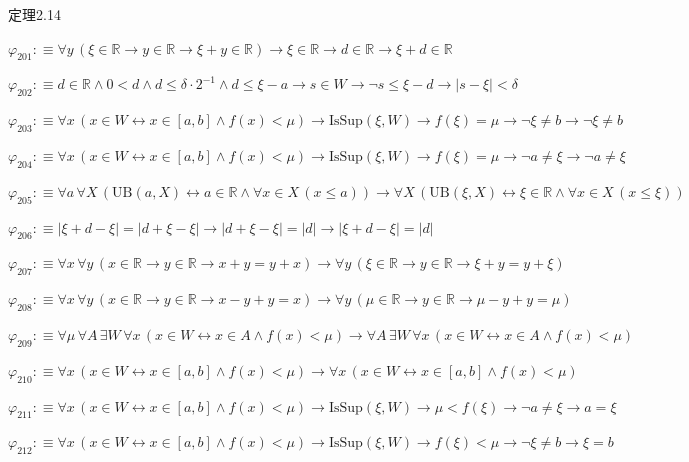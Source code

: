 \begin{fullproof}{定理2.14}
\begin{abbrevlist}
\item $\varphi_{201} :\equiv \forall y\,(\xi \in \mathbb{R} \to y \in \mathbb{R} \to \xi + y \in \mathbb{R}) \to \xi \in \mathbb{R} \to d \in \mathbb{R} \to \xi + d \in \mathbb{R}$
\item $\varphi_{202} :\equiv d \in \mathbb{R} \land 0 < d \land d \leq \delta \cdot 2^{-1} \land d \leq \xi - a \to s \in W \to \neg s \leq \xi - d \to \lvert s - \xi \rvert < \delta$
\item $\varphi_{203} :\equiv \forall x\,(x \in W \leftrightarrow x \in [a,b] \land f(x) < \mu) \to \mathrm{IsSup}(\xi,W) \to f(\xi) = \mu \to \neg \xi \neq b \to \neg \xi \neq b$
\item $\varphi_{204} :\equiv \forall x\,(x \in W \leftrightarrow x \in [a,b] \land f(x) < \mu) \to \mathrm{IsSup}(\xi,W) \to f(\xi) = \mu \to \neg a \neq \xi \to \neg a \neq \xi$
\item $\varphi_{205} :\equiv \forall a\,\forall X\,(\mathrm{UB}(a,X) \leftrightarrow a \in \mathbb{R} \land \forall x \in X\,(x \leq a)) \to \forall X\,(\mathrm{UB}(\xi,X) \leftrightarrow \xi \in \mathbb{R} \land \forall x \in X\,(x \leq \xi))$
\item $\varphi_{206} :\equiv \lvert \xi + d - \xi \rvert = \lvert d + \xi - \xi \rvert \to \lvert d + \xi - \xi \rvert = \lvert d \rvert \to \lvert \xi + d - \xi \rvert = \lvert d \rvert$
\item $\varphi_{207} :\equiv \forall x\,\forall y\,(x \in \mathbb{R} \to y \in \mathbb{R} \to x + y = y + x) \to \forall y\,(\xi \in \mathbb{R} \to y \in \mathbb{R} \to \xi + y = y + \xi)$
\item $\varphi_{208} :\equiv \forall x\,\forall y\,(x \in \mathbb{R} \to y \in \mathbb{R} \to x - y + y = x) \to \forall y\,(\mu \in \mathbb{R} \to y \in \mathbb{R} \to \mu - y + y = \mu)$
\item $\varphi_{209} :\equiv \forall \mu\,\forall A\,\exists W\,\forall x\,(x \in W \leftrightarrow x \in A \land f(x) < \mu) \to \forall A\,\exists W\,\forall x\,(x \in W \leftrightarrow x \in A \land f(x) < \mu)$
\item $\varphi_{210} :\equiv \forall x\,(x \in W \leftrightarrow x \in [a,b] \land f(x) < \mu) \to \forall x\,(x \in W \leftrightarrow x \in [a,b] \land f(x) < \mu)$
\item $\varphi_{211} :\equiv \forall x\,(x \in W \leftrightarrow x \in [a,b] \land f(x) < \mu) \to \mathrm{IsSup}(\xi,W) \to \mu < f(\xi) \to \neg a \neq \xi \to a = \xi$
\item $\varphi_{212} :\equiv \forall x\,(x \in W \leftrightarrow x \in [a,b] \land f(x) < \mu) \to \mathrm{IsSup}(\xi,W) \to f(\xi) < \mu \to \neg \xi \neq b \to \xi = b$

\end{abbrevlist}
\end{fullproof}
